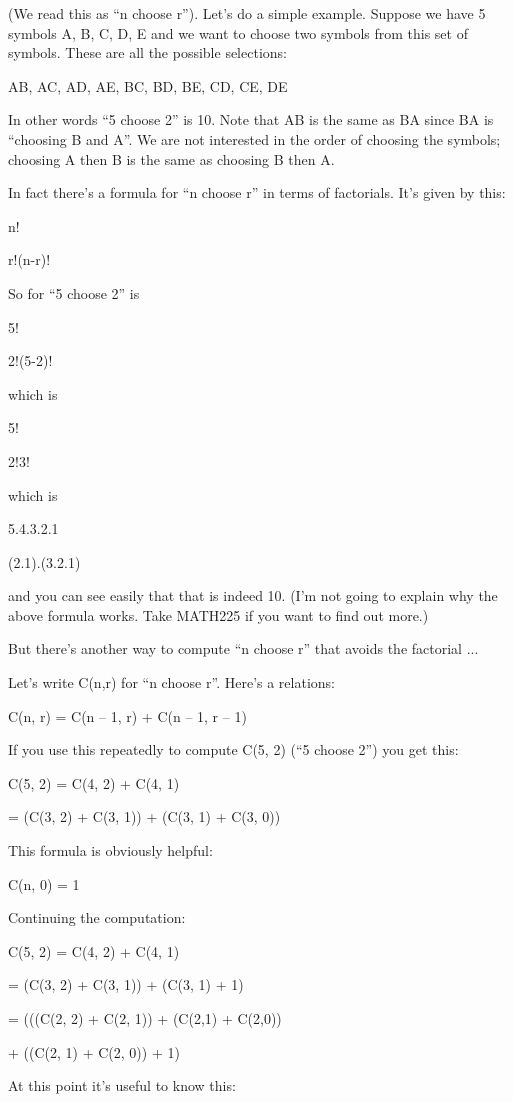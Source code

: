 \documentclass[
]{article}
\begin{document}
(We read this as ``n choose r''). Let's do a simple example. Suppose we
have 5 symbols A, B, C, D, E and we want to choose two symbols from this
set of symbols. These are all the possible selections:

AB, AC, AD, AE, BC, BD, BE, CD, CE, DE

In other words ``5 choose 2'' is 10. Note that AB is the same as BA
since BA is ``choosing B and A''. We are not interested in the order of
choosing the symbols; choosing A then B is the same as choosing B then
A.

In fact there's a formula for ``n choose r'' in terms of factorials.
It's given by this:

n!

r!(n-r)!

So for ``5 choose 2'' is

5!

2!(5-2)!

which is

5!

2!3!

which is

5.4.3.2.1

(2.1).(3.2.1)

and you can see easily that that is indeed 10. (I'm not going to explain
why the above formula works. Take MATH225 if you want to find out more.)

But there's another way to compute ``n choose r'' that avoids the
factorial ...

Let's write C(n,r) for ``n choose r''. Here's a relations:

C(n, r) = C(n -- 1, r) + C(n -- 1, r -- 1)

If you use this repeatedly to compute C(5, 2) (``5 choose 2'') you get
this:

C(5, 2) = C(4, 2) + C(4, 1)

= (C(3, 2) + C(3, 1)) + (C(3, 1) + C(3, 0))

This formula is obviously helpful:

C(n, 0) = 1

Continuing the computation:

C(5, 2) = C(4, 2) + C(4, 1)

= (C(3, 2) + C(3, 1)) + (C(3, 1) + 1)

= (((C(2, 2) + C(2, 1)) + (C(2,1) + C(2,0))

+ ((C(2, 1) + C(2, 0)) + 1)

At this point it's useful to know this:
\end{document}
